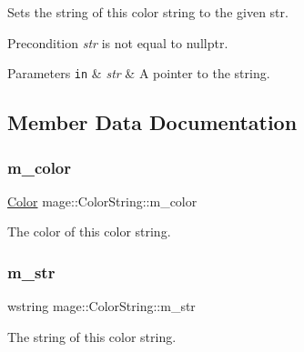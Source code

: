 Sets the string of this color string to the given str.

\begin{DoxyPrecond}{Precondition}
{\itshape str} is not equal to {\ttfamily nullptr}. 
\end{DoxyPrecond}

\begin{DoxyParams}[1]{Parameters}
\mbox{\tt in}  & {\em str} & A pointer to the string. \\
\hline
\end{DoxyParams}


\subsection{Member Data Documentation}
\hypertarget{structmage_1_1_color_string_a3f351c61281fc49786bc13842527d2a3}{}\label{structmage_1_1_color_string_a3f351c61281fc49786bc13842527d2a3} 
\subsubsection{\texorpdfstring{m\+\_\+color}{m\_color}}
{\footnotesize\ttfamily \hyperlink{structmage_1_1_color}{Color} mage\+::\+Color\+String\+::m\+\_\+color\hspace{0.3cm}{\ttfamily [private]}}

The color of this color string. \hypertarget{structmage_1_1_color_string_a9eb840afa5112cd611f5bb1b21edc045}{}\label{structmage_1_1_color_string_a9eb840afa5112cd611f5bb1b21edc045} 
\subsubsection{\texorpdfstring{m\+\_\+str}{m\_str}}
{\footnotesize\ttfamily wstring mage\+::\+Color\+String\+::m\+\_\+str\hspace{0.3cm}{\ttfamily [private]}}

The string of this color string. 